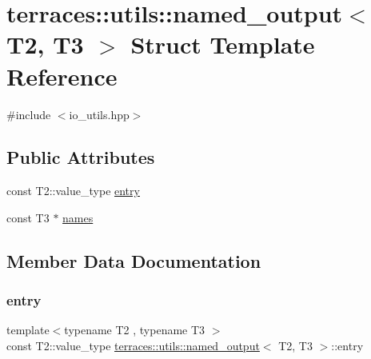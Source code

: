 \hypertarget{structterraces_1_1utils_1_1named__output}{}\section{terraces\+:\+:utils\+:\+:named\+\_\+output$<$ T2, T3 $>$ Struct Template Reference}
\label{structterraces_1_1utils_1_1named__output}


{\ttfamily \#include $<$io\+\_\+utils.\+hpp$>$}

\subsection*{Public Attributes}
\begin{DoxyCompactItemize}
\item 
const T2\+::value\+\_\+type \hyperlink{structterraces_1_1utils_1_1named__output_aee66790c2fab98312ade67eb7f7c6227}{entry}
\item 
const T3 $\ast$ \hyperlink{structterraces_1_1utils_1_1named__output_ab239297b7cb9b47431551ec22d50ecb2}{names}
\end{DoxyCompactItemize}


\subsection{Member Data Documentation}
\mbox{\label{structterraces_1_1utils_1_1named__output_aee66790c2fab98312ade67eb7f7c6227}} 
\subsubsection{\texorpdfstring{entry}{entry}}
{\footnotesize\ttfamily template$<$typename T2 , typename T3 $>$ \\
const T2\+::value\+\_\+type \hyperlink{structterraces_1_1utils_1_1named__output}{terraces\+::utils\+::named\+\_\+output}$<$ T2, T3 $>$\+::entry}

\mbox{\label{structterraces_1_1utils_1_1named__output_ab239297b7cb9b47431551ec22d50ecb2}} 
